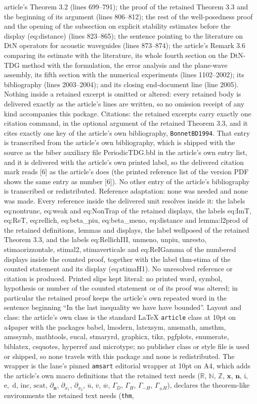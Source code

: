 \documentclass[10pt,a4paper]{amsart}
\newcommand{\IR}{{\mathbb R}}
\newcommand{\IN}{{\mathbb N}}
\newcommand{\IZ}{{\mathbb Z}}
\newcommand{\bx}{{\mathbf x}}
\newcommand{\bn}{{\mathbf n}}
\newcommand{\ri}{{\mathrm i}}
\newcommand{\re}{{\mathrm e}}
\newcommand{\rd}{{\,\mathrm d}}
\newcommand{\inc}{{\mathrm{inc}}}
\newcommand{\scat}{{\mathrm{scat}}}
\newcommand{\dn}{{\partial_\bn}}
\newcommand{\dxo}{{\partial_{x_1}}}
\newcommand{\dxt}{{\partial_{x_2}}}
\newcommand{\cu}{{\overline{u}}}
\newcommand{\cv}{{\overline{v}}}
\newcommand{\cw}{{\overline{w}}}
\newcommand{\GD}{{\Gamma_D}}
\newcommand{\GH}{{\Gamma_H}}
\newcommand{\GmH}{{\Gamma_{-H}}}
\newcommand{\GpmH}{{\Gamma_{\pm H}}}
\begin{document}
article's Theorem 3.2 (lines 699--791); the proof of the retained Theorem 3.3 and the beginning of its argument (lines 806--812); the rest of the well-posedness proof and the opening of the subsection on explicit stability estimates before the display (eq:distance) (lines 823--865); the sentence pointing to the literature on DtN operators for acoustic waveguides (lines 873--874); the article's Remark 3.6 comparing its estimate with the literature, its whole fourth section on the DtN-TDG method with the formulation, the error analysis and the plane-wave assembly, its fifth section with the numerical experiments (lines 1102--2002); its bibliography (lines 2003--2004); and its closing end-document line (line 2005). Nothing inside a retained excerpt is omitted or altered: every retained body is delivered exactly as the article's lines are written, so no omission receipt of any kind accompanies this package. Citations: the retained excerpts carry exactly one citation command, in the optional argument of the retained Theorem 3.3, and it cites exactly one key of the article's own bibliography, \texttt{BonnetBD1994}. That entry is transcribed from the article's own bibliography, which is shipped with the source as the biber auxiliary file PeriodicTDG.bbl in the article's own entry list, and it is delivered with the article's own printed label, so the delivered citation mark reads [6] as the article's does (the printed reference list of the version PDF shows the same entry as number [6]). No other entry of the article's bibliography is transcribed or redistributed. Reference adaptation: none was needed and none was made. Every reference inside the delivered unit resolves inside it: the labels eq:nontrunc, eq:weak and eq:NonTrap of the retained displays, the labels eq:ImT, eq:ReT, eq:rellich, eq:beta\_piu, eq:beta\_meno, eq:distance and lemma:l2prod of the retained definitions, lemmas and displays, the label wellposed of the retained Theorem 3.3, and the labels eq:RellichIII, unmeno, unpiu, unresto, stimaorizzontale, stimal2, stimaverticale and eq:ReIGamma of the numbered displays inside the counted proof, together with the label thm-stima of the counted statement and its display (eq:stimaH1). No unresolved reference or citation is produced. Printed slips kept literal: no printed word, symbol, hypothesis or number of the counted statement or of its proof was altered; in particular the retained proof keeps the article's own repeated word in the sentence beginning ``In the last inequality we have have bounded''. Layout and class: the article's own class is the standard LaTeX \texttt{article} class at 10pt on a4paper with the packages babel, lmodern, latexsym, amsmath, amsthm, amssymb, mathtools, eucal, stmaryrd, graphicx, tikz, pgfplots, enumerate, biblatex, csquotes, hyperref and microtype; no publisher class or style file is used or shipped, so none travels with this package and none is redistributed. The wrapper is the lane's pinned \texttt{amsart} editorial wrapper at 10pt on A4, which adds the article's own macro definitions that the retained text needs ($\IR$, $\IN$, $\IZ$, $\bx$, $\bn$, $\ri$, $\re$, $\rd$, $\inc$, $\scat$, $\dn$, $\dxo$, $\dxt$, $\cu$, $\cv$, $\cw$, $\GD$, $\GH$, $\GmH$, $\GpmH$), declares the theorem-like environments the retained text needs (\texttt{thm}, 
\end{document}
